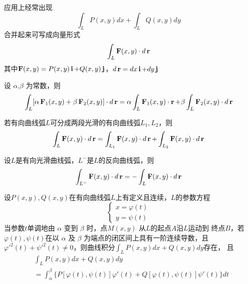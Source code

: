 \documentclass[11pt]{article}
\begin{document}
应用上经常出现
\begin{equation*}
\int_LP(x,y)dx+\int_LQ(x,y)dy
\end{equation*}
合并起来可写成向量形式
\begin{equation*}
\int_L\operatorname{\textbf{F}}(x,y)\cdot d\operatorname{\textbf{r}}
\end{equation*}
其中\(\operatorname{\textbf{F}}(x,y)=P(x,y)\operatorname{\textbf{i}}+Q(x,y)\operatorname{\textbf{j}}\)，\(d\operatorname{\textbf{r}}=dx\operatorname{\textbf{i}}+dy\operatorname{\textbf{j}}\)

\begin{proposition}[]
设 \(\alpha\),\(\beta\) 为常数，则
\begin{equation*}
\int_L[\alpha\operatorname{\textbf{F}}_1(x,y)+\beta\operatorname{\textbf{F}}_2(x,y)]\cdot d\operatorname{\textbf{r}}=
\alpha\int_L\operatorname{\textbf{F}}_1(x,y)\cdot\operatorname{\textbf{r}}+\beta\int_L\operatorname{\textbf{F}}_2(x,y)\cdot d\operatorname{\textbf{r}}
\end{equation*}
\end{proposition}

\begin{proposition}[]
若有向曲线弧\(L\)可分成两段光滑的有向曲线弧\(L_1,L_2\)，则
\begin{equation*}
\int_L\operatorname{\textbf{F}}(x,y)\cdot d\operatorname{\textbf{r}}=\int_{L_1}\operatorname{\textbf{F}}(x,y)\cdot d\operatorname{\textbf{r}}+
\int_{L_2}\operatorname{\textbf{F}}(x,y)\cdot d\operatorname{\textbf{r}}
\end{equation*}
\end{proposition}

\begin{proposition}[]
设\(L\)是有向光滑曲线弧，\(L^-\)是\(L\)的反向曲线弧，则
\begin{equation*}
\int_{L^-}\operatorname{\textbf{F}}(x,y)\cdot d\operatorname{\textbf{r}}=-\int_L\operatorname{\textbf{F}}(x,y)\cdot d\operatorname{\textbf{r}}
\end{equation*}
\end{proposition}

\begin{theorem}[]
设\(P(x,y),Q(x,y)\)在有向曲线弧\(L\)上有定义且连续，\(L\)的参数方程
\begin{equation*}
\begin{cases}
x=\varphi(t)\\
y=\psi(t)
\end{cases}
\end{equation*}
当参数\(t\)单调地由 \(\alpha\) 变到 \(\beta\) 时，点\(M(x,y)\) 从\(L\)的起点\(A\)沿\(L\)运动到
终点\(B\)，若\(\varphi(t),\psi(t)\)在以 \(\alpha\) 及 \(\beta\) 为端点的闭区间上具有一阶连续导数，且
\(\varphi'^2(t)+\psi'^2(t)\neq0\)，则曲线积分\(\int_LP(x,y)dx+Q(x,y)dy\)存在，
且
\begin{align*}
&\int_LP(x,y)dx+Q(x,y)dy\\
&=\int_\alpha^\beta\{P[\varphi(t),\psi(t)]\varphi'(t)+Q[\varphi(t),\psi(t)]\psi'(t)\}dt
\end{align*}
\end{theorem}
\end{document}
